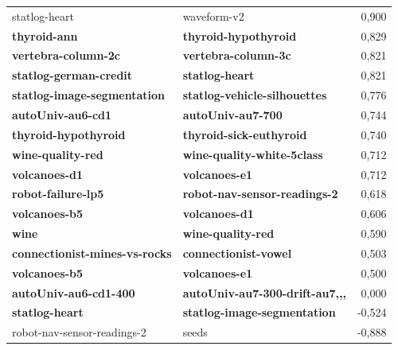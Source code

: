 \begin{table}
{\begin{tabular}{llr}
statlog-heart                      & waveform-v2                        & 0,900\\
\textbf{thyroid-ann                        } & \textbf{thyroid-hypothyroid                }& 0,829\\ \hdashline
\textbf{vertebra-column-2c                 } & \textbf{vertebra-column-3c                 }& 0,821\\ \hdashline
\textbf{statlog-german-credit              } & \textbf{statlog-heart                      }& 0,821\\ \hdashline
\textbf{statlog-image-segmentation         } & \textbf{statlog-vehicle-silhouettes        }& 0,776\\ \hdashline
\textbf{autoUniv-au6-cd1               } & \textbf{autoUniv-au7-700                   }& 0,744\\ \hdashline
\textbf{thyroid-hypothyroid                } & \textbf{thyroid-sick-euthyroid             }& 0,740\\ \hdashline
\textbf{wine-quality-red                   } & \textbf{wine-quality-white-5class          }& 0,712\\ \hdashline
\textbf{volcanoes-d1                       } & \textbf{volcanoes-e1                       }& 0,712\\ \hdashline
\textbf{robot-failure-lp5                  } & \textbf{robot-nav-sensor-readings-2        }& 0,618\\ \hdashline
\textbf{volcanoes-b5                       } & \textbf{volcanoes-d1                       }& 0,606\\ \hdashline
\textbf{wine                               } & \textbf{wine-quality-red                   }& 0,590\\ \hdashline
\textbf{connectionist-mines-vs-rocks       } & \textbf{connectionist-vowel                }& 0,503\\ \hdashline
\textbf{volcanoes-b5                       } & \textbf{volcanoes-e1                       }& 0,500\\ \hdashline 
\hdashline
\textbf{autoUniv-au6-cd1-400               } & \textbf{autoUniv-au7-300-drift-au7,,,}& 0,000\\ \hdashline
\hdashline
\textbf{statlog-heart                      } & \textbf{statlog-image-segmentation         }& -0,524\\ \hdashline
robot-nav-sensor-readings-2        & seeds                              & -0,888\\
\bottomrule
\end{tabular}}
\end{table}

